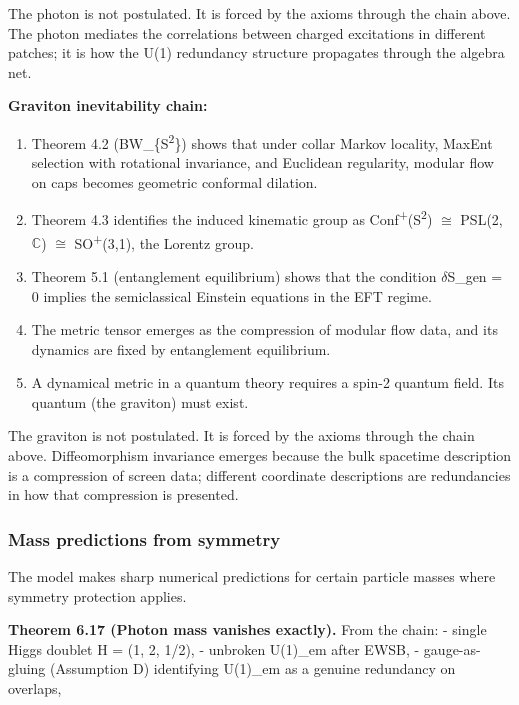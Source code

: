 \documentclass[11pt,a4paper]{article}
\theoremstyle{remark}
\providecommand{\tightlist}{%
  \setlength{\itemsep}{0pt}\setlength{\parskip}{0pt}}
\begin{document}
The photon is not postulated. It is forced by the axioms through the chain
above. The photon mediates the correlations between charged excitations in
different patches; it is how the U(1) redundancy structure propagates through
the algebra net.

\textbf{Graviton inevitability chain:}

\begin{enumerate}
\def\labelenumi{\arabic{enumi}.}
\tightlist
\item
  Theorem 4.2 (BW\_\{S\textsuperscript{2}\}) shows that under collar Markov locality, MaxEnt
  selection with rotational invariance, and Euclidean regularity, modular flow
  on caps becomes geometric conformal dilation.
\item
  Theorem 4.3 identifies the induced kinematic group as
  Conf\textsuperscript{+}(S\textsuperscript{2}) \ensuremath{\cong} PSL(2,\ensuremath{\mathbb{C}}) \ensuremath{\cong} SO\textsuperscript{+}(3,1), the Lorentz group.
\item
  Theorem 5.1 (entanglement equilibrium) shows that the condition
  \ensuremath{\delta}S\_gen = 0 implies the semiclassical Einstein equations in the EFT regime.
\item
  The metric tensor emerges as the compression of modular flow data, and its
  dynamics are fixed by entanglement equilibrium.
\item
  A dynamical metric in a quantum theory requires a spin-2 quantum field.
  Its quantum (the graviton) must exist.
\end{enumerate}

The graviton is not postulated. It is forced by the axioms through the chain
above. Diffeomorphism invariance emerges because the bulk spacetime description
is a compression of screen data; different coordinate descriptions are
redundancies in how that compression is presented.

\subsubsection{Mass predictions from symmetry}\label{mass-predictions-from-symmetry}

The model makes sharp numerical predictions for certain particle masses
where symmetry protection applies.

\textbf{Theorem 6.17 (Photon mass vanishes exactly).} From the chain:
- single Higgs doublet H = (1, 2, 1/2),
- unbroken U(1)\_em after EWSB,
- gauge-as-gluing (Assumption D) identifying U(1)\_em as a genuine redundancy
on overlaps,
\end{document}
